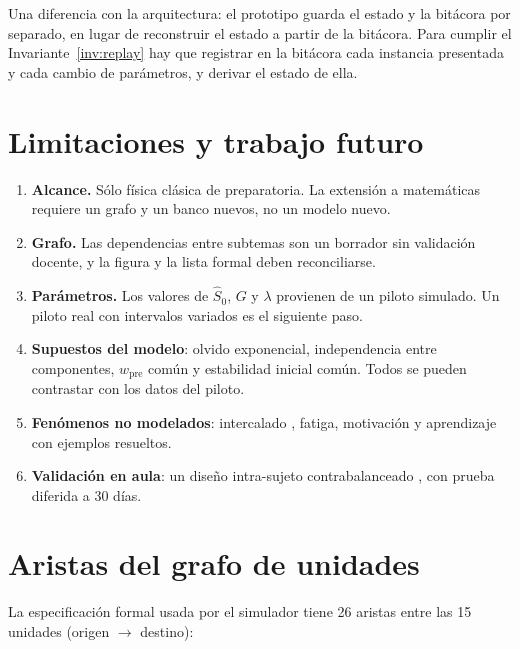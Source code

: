 \documentclass[11pt]{article}
\theoremstyle{definition}
\theoremstyle{remark}
\newcommand{\Sh}{\hat S}
\begin{document}
Una diferencia con la arquitectura: el prototipo guarda el estado y la bitácora por separado, en lugar de reconstruir el estado a partir de la bitácora. Para cumplir el Invariante~\ref{inv:replay} hay que registrar en la bitácora cada instancia presentada y cada cambio de parámetros, y derivar el estado de ella.

\section{Limitaciones y trabajo futuro}

\begin{enumerate}
\item \textbf{Alcance.} Sólo física clásica de preparatoria. La extensión a matemáticas requiere un grafo y un banco nuevos, no un modelo nuevo.
\item \textbf{Grafo.} Las dependencias entre subtemas son un borrador sin validación docente, y la figura y la lista formal deben reconciliarse.
\item \textbf{Parámetros.} Los valores de $\Sh_0$, $G$ y $\lambda$ provienen de un piloto simulado. Un piloto real con intervalos variados es el siguiente paso.
\item \textbf{Supuestos del modelo}: olvido exponencial, independencia entre componentes, $w_{\mathrm{pre}}$ común y estabilidad inicial común. Todos se pueden contrastar con los datos del piloto.
\item \textbf{Fenómenos no modelados}: intercalado \citep{rohrer2015}, fatiga, motivación y aprendizaje con ejemplos resueltos.
\item \textbf{Validación en aula}: un diseño intra-sujeto contrabalanceado \citep{lindsey2014}, con prueba diferida a 30 días.
\end{enumerate}

\appendix
\section{Aristas del grafo de unidades}
\label{app:aristas}

La especificación formal usada por el simulador tiene 26 aristas entre las 15 unidades (origen $\to$ destino):
\end{document}
